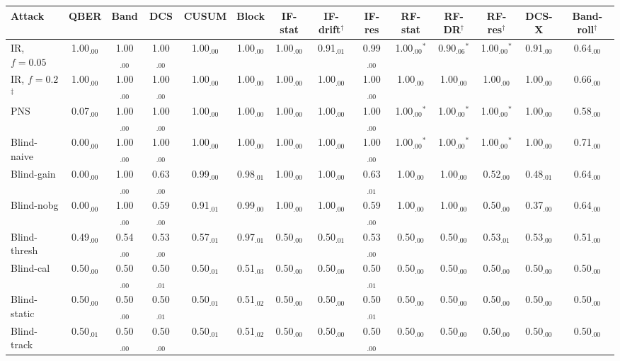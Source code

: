 \begin{tabular}{lccccccccccccc}
\hline
Attack & QBER & Band & DCS & CUSUM & Block & IF-stat & IF-drift$^\dagger$ & IF-res & RF-stat & RF-DR$^\dagger$ & RF-res$^\dagger$ & DCS-X & Band-roll$^\dagger$\\
\hline
IR, $f=0.05$ & 1.00$_{.00}$ & 1.00$_{.00}$ & 1.00$_{.00}$ & 1.00$_{.00}$ & 1.00$_{.00}$ & 1.00$_{.00}$ & 0.91$_{.01}$ & 0.99$_{.00}$ & 1.00$_{.00}$$^*$ & 0.90$_{.06}$$^*$ & 1.00$_{.00}$$^*$ & 0.91$_{.00}$ & 0.64$_{.00}$\\
IR, $f=0.2$$^\ddagger$ & 1.00$_{.00}$ & 1.00$_{.00}$ & 1.00$_{.00}$ & 1.00$_{.00}$ & 1.00$_{.00}$ & 1.00$_{.00}$ & 1.00$_{.00}$ & 1.00$_{.00}$ & 1.00$_{.00}$ & 1.00$_{.00}$ & 1.00$_{.00}$ & 1.00$_{.00}$ & 0.66$_{.00}$\\
PNS & 0.07$_{.00}$ & 1.00$_{.00}$ & 1.00$_{.00}$ & 1.00$_{.00}$ & 1.00$_{.00}$ & 1.00$_{.00}$ & 1.00$_{.00}$ & 1.00$_{.00}$ & 1.00$_{.00}$$^*$ & 1.00$_{.00}$$^*$ & 1.00$_{.00}$$^*$ & 1.00$_{.00}$ & 0.58$_{.00}$\\
Blind-naive & 0.00$_{.00}$ & 1.00$_{.00}$ & 1.00$_{.00}$ & 1.00$_{.00}$ & 1.00$_{.00}$ & 1.00$_{.00}$ & 1.00$_{.00}$ & 1.00$_{.00}$ & 1.00$_{.00}$$^*$ & 1.00$_{.00}$$^*$ & 1.00$_{.00}$$^*$ & 1.00$_{.00}$ & 0.71$_{.00}$\\
Blind-gain & 0.00$_{.00}$ & 1.00$_{.00}$ & 0.63$_{.00}$ & 0.99$_{.00}$ & 0.98$_{.01}$ & 1.00$_{.00}$ & 1.00$_{.00}$ & 0.63$_{.01}$ & 1.00$_{.00}$ & 1.00$_{.00}$ & 0.52$_{.00}$ & 0.48$_{.01}$ & 0.64$_{.00}$\\
Blind-nobg & 0.00$_{.00}$ & 1.00$_{.00}$ & 0.59$_{.00}$ & 0.91$_{.01}$ & 0.99$_{.00}$ & 1.00$_{.00}$ & 1.00$_{.00}$ & 0.59$_{.00}$ & 1.00$_{.00}$ & 1.00$_{.00}$ & 0.50$_{.00}$ & 0.37$_{.00}$ & 0.64$_{.00}$\\
Blind-thresh & 0.49$_{.00}$ & 0.54$_{.00}$ & 0.53$_{.00}$ & 0.57$_{.01}$ & 0.97$_{.01}$ & 0.50$_{.00}$ & 0.50$_{.01}$ & 0.53$_{.00}$ & 0.50$_{.00}$ & 0.50$_{.00}$ & 0.53$_{.01}$ & 0.53$_{.00}$ & 0.51$_{.00}$\\
Blind-cal & 0.50$_{.00}$ & 0.50$_{.00}$ & 0.50$_{.01}$ & 0.50$_{.01}$ & 0.51$_{.03}$ & 0.50$_{.00}$ & 0.50$_{.00}$ & 0.50$_{.01}$ & 0.50$_{.00}$ & 0.50$_{.00}$ & 0.50$_{.00}$ & 0.50$_{.00}$ & 0.50$_{.00}$\\
Blind-static & 0.50$_{.00}$ & 0.50$_{.00}$ & 0.50$_{.01}$ & 0.50$_{.01}$ & 0.51$_{.02}$ & 0.50$_{.00}$ & 0.50$_{.00}$ & 0.50$_{.01}$ & 0.50$_{.00}$ & 0.50$_{.00}$ & 0.50$_{.00}$ & 0.50$_{.00}$ & 0.50$_{.00}$\\
Blind-track & 0.50$_{.01}$ & 0.50$_{.00}$ & 0.50$_{.00}$ & 0.50$_{.01}$ & 0.51$_{.02}$ & 0.50$_{.00}$ & 0.50$_{.00}$ & 0.50$_{.00}$ & 0.50$_{.00}$ & 0.50$_{.00}$ & 0.50$_{.00}$ & 0.50$_{.00}$ & 0.50$_{.00}$\\

\end{tabular}
